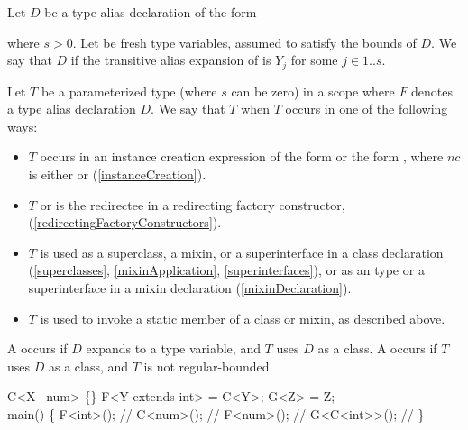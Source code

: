 \documentclass[makeidx]{article}
\begin{document}
\LMHash{}%
%
Let $D$ be a type alias declaration of the form

\noindent
{}

\noindent
where $s > 0$.
%
Let  be fresh type variables,
assumed to satisfy the bounds of $D$.
We say that $D$
if the transitive alias expansion of
is $Y_j$ for some $j \in 1 .. s$.

\LMHash{}%
%
Let $T$ be a parameterized type 
(where $s$ can be zero)
in a scope where $F$ denotes a type alias declaration $D$.
We say that $T$
when $T$ occurs in one of the following ways:

\begin{itemize}
\item
  $T$ occurs in an instance creation expression of the form
   or the form ,
  where $nc$ is either \NEW{} or \CONST{}
  (\ref{instanceCreation}).
\item
  $T$ or  is the redirectee in a redirecting factory constructor,
  (\ref{redirectingFactoryConstructors}).
\item
  $T$ is used as a superclass, a mixin, or a superinterface
  in a class declaration
  (\ref{superclasses}, \ref{mixinApplication}, \ref{superinterfaces}),
  or as an \ON{} type or a superinterface in a mixin declaration
  (\ref{mixinDeclaration}).
\item
  $T$ is used to invoke a static member of a class or mixin,
  as described above.
\end{itemize}

\LMHash{}%
A  occurs if $D$ expands to a type variable,
and $T$ uses $D$ as a class.
A  occurs if $T$ uses $D$ as a class,
and $T$ is not regular-bounded.

\begin{dartCode}
\CLASS{} C<X \EXTENDS\ num> \{\}
\TYPEDEF{} F<Y extends int> = C<Y>;
\TYPEDEF{} G<Z> = Z;
\\
\VOID{} main() \{
  F<int>(); // 
  C<num>(); // 
  F<num>(); // 
  G<C<int>{}>(); // 
\}
\end{dartCode}
\end{document}

